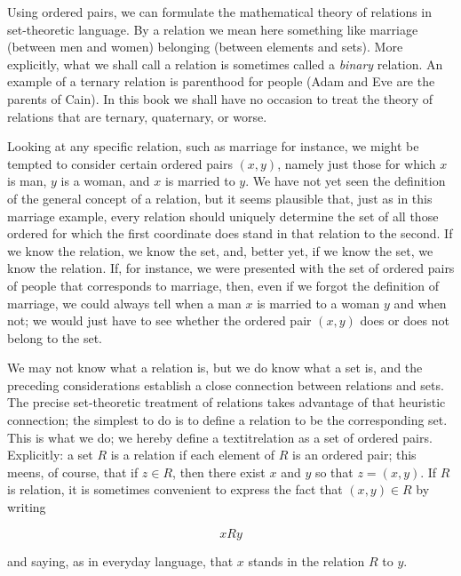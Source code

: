 
Using ordered pairs, we can formulate the mathematical theory of relations in set-theoretic language. By a relation we mean here something like marriage (between men and women) belonging (between elements and sets).  More explicitly, what we shall call a relation is sometimes called a \textit{binary} relation. An example of a ternary relation is parenthood for people (Adam and Eve are the parents of Cain). In this book we shall have no occasion to treat the theory of relations that are ternary, quaternary, or worse. 

Looking at any specific relation, such as marriage for instance, we might be tempted to consider certain ordered pairs $(x,y)$, namely just those for which $x$ is man, $y$ is a woman, and $x$ is married to $y$. We have not yet seen the definition of the general concept of a relation, but it seems plausible that, just as in this marriage example, every relation should uniquely determine the set of all those ordered for which the first coordinate does stand in that relation to the second. If we know the relation, we know the set, and, better yet, if we know the set, we know the relation. If, for instance, we were presented with the set of ordered pairs of people that corresponds to marriage, then, even if we forgot the definition of marriage, we could always tell when a man $x$ is married to a woman $y$ and when not; we would just have to see whether the ordered pair $(x,y)$ does or does not belong to the set.

We may not know what a relation is, but we do know what a set is, and the preceding considerations establish a close connection between relations and sets. The precise set-theoretic treatment of relations takes advantage of that heuristic connection; the simplest to do is to define a relation to be the corresponding set. This is what we do; we hereby define a textit{relation} as a set of ordered pairs. Explicitly: a set $R$ is a relation if each element of $R $ is an ordered pair; this meens, of course, that if $z \in R $, then there exist $x$ and $y$ so that $z = (x,y)$. If $R $ is relation, it is sometimes convenient to express the fact that $(x, y) \in R $ by writing 

\begin{equation*}
x R  y
\end{equation*}

and saying, as in everyday language, that $x$ stands in the relation $R $ to $y$. 

